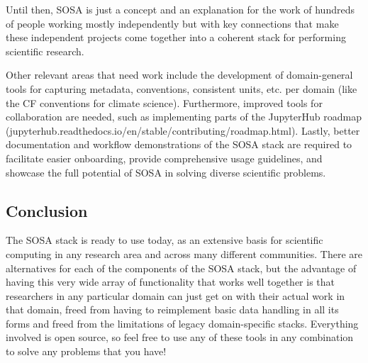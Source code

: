 Until then, SOSA is just a concept and an explanation for the work of hundreds of people working mostly independently but with key connections that make these independent projects come together into a coherent stack for performing scientific research.

Other relevant areas that need work include the development of domain-general tools for capturing metadata, conventions, consistent units, etc. per domain (like the CF conventions for climate science). Furthermore, improved tools for collaboration are needed, such as implementing parts of the JupyterHub roadmap (jupyterhub.readthedocs.io/en/stable/contributing/roadmap.html). Lastly, better documentation and workflow demonstrations of the SOSA stack are required to facilitate easier onboarding, provide comprehensive usage guidelines, and showcase the full potential of SOSA in solving diverse scientific problems.


\subsection{Conclusion}

The SOSA stack is ready to use today, as an extensive basis for scientific computing in any research area and across many different communities. There are alternatives for each of the components of the SOSA stack, but the advantage of having this very wide array of functionality that works well together is that researchers in any particular domain can just get on with their actual work in that domain, freed from having to reimplement basic data handling in all its forms and freed from the limitations of legacy domain-specific stacks. Everything involved is open source, so feel free to use any of these tools in any combination to solve any problems that you have!
